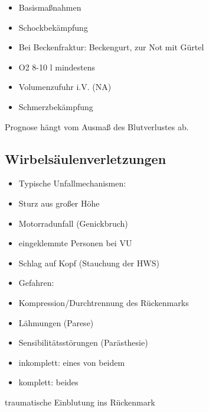 \documentclass{article}
\begin{document}
\begin{itemize}
\item Basisma{\ss}nahmen

\item Schockbek\"ampfung

\item Bei Beckenfraktur: Beckengurt, zur Not mit
G\"urtel%
%


\item O2  8-10 l mindestens

\item Volumenzufuhr i.V. (NA)

\item Schmerzbek\"ampfung

\end{itemize}
Prognose h\"angt vom Ausma{\ss} des  Blutverlustes ab.

\subsection{Wirbels\"aulenverletzungen}
\begin{itemize}
\item Typische Unfallmechanismen:

\end{itemize}
\begin{itemize}
\item Sturz aus gro{\ss}er H\"ohe

\item Motorradunfall (Genickbruch)

\item eingeklemmte Personen bei VU

\item Schlag auf Kopf (Stauchung der HWS)

\end{itemize}
\begin{itemize}
\item Gefahren:

\end{itemize}
\begin{itemize}
\item Kompression/Durchtrennung des  R\"uckenmarks

\item L\"ahmungen (Parese)

\item Sensibilit\"atsst\"orungen (Par\"asthesie)

\end{itemize}
\begin{itemize}
\item inkomplett: eines von beidem

\item komplett: beides

\end{itemize}
traumatische Einblutung ins R\"uckenmark
\end{document}
